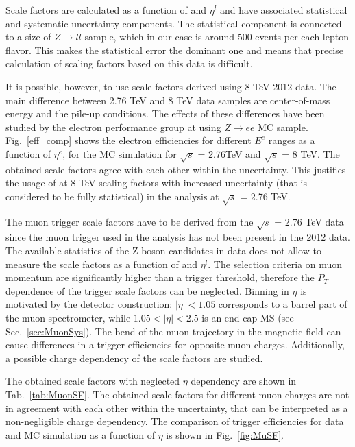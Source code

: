 Scale factors are calculated  as a function of \ptl and $\eta^{l}$ and have associated statistical and systematic uncertainty components. The statistical component is connected to a size of $Z\to ll$ sample, which in our case is around 500 events per each lepton flavor. This makes the statistical error the dominant one and means that precise calculation of scaling factors based on this data is difficult.

It is possible, however, to use scale factors derived using 8 TeV 2012 data\cite{ElecEff}. The main difference between 2.76 TeV and 8 TeV data samples are center-of-mass energy and the pile-up conditions. The effects of these differences have been studied by the electron performance group at \atlas using $Z\to ee$ MC sample. Fig.~\ref{eff_comp} shows the electron efficiencies for different $E^e$ ranges as a function of $\eta^{e}$, for the MC simulation for $\sqrt{s}$ = 2.76TeV and $\sqrt{s}$ = 8 TeV. The obtained scale factors agree with each other within the uncertainty. This justifies the usage of at 8 TeV scaling factors with increased uncertainty (that is considered to be fully statistical) in the analysis at $\sqrt{s}$ = 2.76 TeV. 

The muon trigger scale factors have to be derived from the $\sqrt{s}$ = 2.76 TeV data since the muon trigger used in the analysis has not been present in the 2012 data. The available statistics of the Z-boson candidates in data does not allow to measure the scale factors as a function of \ptl and $\eta^{l}$.  The selection criteria on muon momentum are significantly higher than a trigger threshold, therefore the $P_T$ dependence of the trigger scale factors can be neglected. Binning in $\eta$ is motivated by the detector construction: $|\eta|<1.05$ corresponds to a barrel part of the muon spectrometer, while $1.05<|\eta|<2.5$ is an end-cap MS (see Sec.~\ref{sec:MuonSys}). The bend of the muon trajectory in the magnetic field can cause differences in a trigger efficiencies for opposite muon charges. Additionally, a possible charge dependency of the scale factors are studied. 

The obtained scale factors with neglected $\eta$ dependency are shown in Tab.~\ref{tab:MuonSF}. The obtained scale factors for different muon charges are not in agreement with each other within the uncertainty, that can be interpreted as a non-negligible charge dependency. The comparison of trigger efficiencies for data and MC simulation as a function of $\eta$ is shown in Fig.~\ref{fig:MuSF}. 

